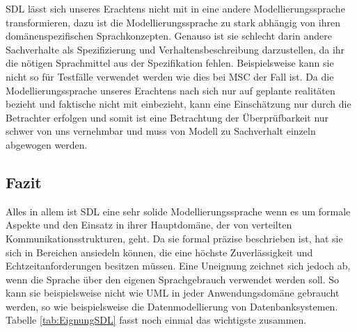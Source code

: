 \ac{SDL} lässt sich unseres Erachtens nicht mit in eine andere Modellierungssprache transformieren, dazu ist die Modellierungssprache zu stark abhängig von ihren domänenspezifischen Sprachkonzepten. Genauso ist sie schlecht darin andere Sachverhalte als Spezifizierung und Verhaltensbeschreibung darzustellen, da ihr die nötigen Sprachmittel aus der Spezifikation fehlen. Beispielsweise kann sie nicht so für Testfälle verwendet werden wie dies bei \ac{MSC} der Fall ist.
Da die Modellierungssprache unseres Erachtens nach sich nur auf geplante realitäten bezieht und faktische nicht mit einbezieht, kann eine Einschätzung nur durch die Betrachter erfolgen und somit ist eine Betrachtung der Überprüfbarkeit nur schwer von uns vernehmbar und muss von Modell zu Sachverhalt einzeln abgewogen werden.

\subsection{Fazit}
\label{ssc:SDL_Fazit}
Alles in allem ist \ac{SDL} eine sehr solide Modellierungssprache wenn es um formale Aspekte und den Einsatz in ihrer Hauptdomäne, der von verteilten Kommunikationsstrukturen, geht. Da sie formal präzise beschrieben ist, hat sie sich in Bereichen ansiedeln können, die eine höchste Zuverlässigkeit und Echtzeitanforderungen besitzen müssen. Eine Uneignung zeichnet sich jedoch ab, wenn die Sprache über den eigenen Sprachgebrauch verwendet werden soll. So kann sie beispielsweise nicht wie \ac{UML} in jeder Anwendungsdomäne gebraucht werden, so wie beispielsweise die Datenmodellierung von Datenbanksystemen. Tabelle \ref{tab:EignungSDL} fasst noch einmal das wichtigste zusammen.
